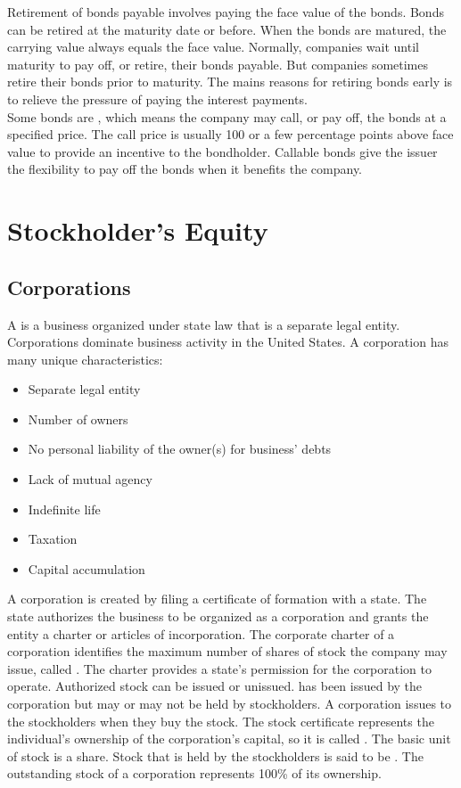 \documentclass{article}
\begin{document}
Retirement of bonds payable involves paying the face value of the bonds. Bonds can be retired at the maturity date or before. When the bonds are matured, the carrying value always equals the face value. Normally, companies wait until maturity to pay off, or retire, their bonds payable. But companies sometimes retire their bonds prior to maturity. The mains reasons for retiring bonds early is to relieve the pressure of paying the interest payments. \\ 

Some bonds are , which means the company may call, or pay off, the bonds at a specified price. The call price is usually 100 or a few percentage points above face value to provide an incentive to the bondholder. Callable bonds give the issuer the flexibility to pay off the bonds when it benefits the company. 

\section{Stockholder's Equity}

\subsection{Corporations}

A  is a business organized under state law that is a separate legal entity. Corporations dominate business activity in the United States. A corporation has many unique characteristics:
\begin{itemize}
  \item Separate legal entity
  \item Number of owners 
  \item No personal liability of the owner(s) for business' debts 
  \item Lack of mutual agency 
  \item Indefinite life 
  \item Taxation 
  \item Capital accumulation 
\end{itemize}

A corporation is created by filing a certificate of formation with a state. The state authorizes the business to be organized as a corporation and grants the entity a charter or articles of incorporation.  The corporate charter of a corporation identifies the maximum number of shares of stock the company may issue, called . The charter provides a state's permission for the corporation to operate. Authorized stock can be issued or unissued.  has been issued by the corporation but may or may not be held by stockholders. A corporation issues  to the stockholders when they buy the stock. The stock certificate represents the individual's ownership of the corporation's capital, so it is called . The basic unit of stock is a share. Stock that is held by the stockholders is said to be . The outstanding stock of a corporation represents 100\% of its ownership. 
\end{document}
